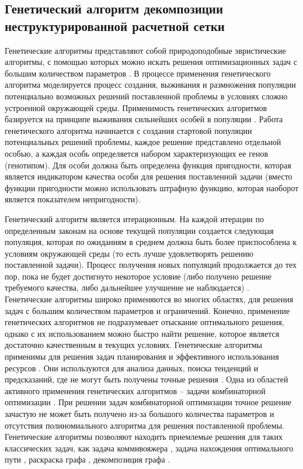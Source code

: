 \subsection{Генетический алгоритм декомпозиции неструктурированной расчетной сетки}\label{sec:text_2_genetic}

Генетические алгоритмы представляют собой природоподобные эвристические алгоритмы, с помощью которых можно искать решения оптимизационных задач с большим количеством параметров \cite{Chahar2021Gen,Wirayanti2025Gen}.
В процессе применения генетического алгоритма моделируется процесс создания, выживания и размножения популяции потенциально возможных решений поставленной проблемы в условиях сложно устроенной окружающей среды.
Применимость генетических алгоритмов базируется на принципе выживания сильнейших особей в популяции \cite{Naaman2025Gen}.
Работа генетического алгоритма начинается с создания стартовой популяции потенциальных решений проблемы, каждое решение представлено отдельной особью, а каждая особь определяется набором характеризующих ее генов (генотипом).
Для особи должна быть определена функция пригодности, которая является индикатором качества особи для решения поставленной задачи (вместо функции пригодности можно использовать штрафную функцию, которая наоборот является показателем непригодности). 

Генетический алгоритм является итерационным.
На каждой итерации по определенным законам на основе текущей популяции создается следующая популяция, которая по ожиданиям в среднем должна быть более приспособлена к условиям окружающей среды (то есть лучше удовлетворять решению поставленной задачи).
Процесс получения новых популяций продолжается до тех пор, пока не будет достигнуто некоторое условие (либо получено решение требуемого качества, либо дальнейшее улучшение не наблюдается) \cite{Charilogis2024Gen}.
Генетические алгоритмы широко применяются во многих областях, для решения задач с большим количеством параметров и ограничений.
Конечно, применение генетических алгоритмов не подразумевает отыскание оптимального решения, однако с их использованием можно быстро найти решение, которое является достаточно качественным в текущих условиях.
Генетические алгоритмы применимы для решения задач планирования \cite{Dawei2025Gen} и эффективного использования ресурсов \cite{Fang2025Gen,Mahmood2024Gen}.
Они используются для анализа данных, поиска тенденций и предсказаний, где не могут быть получены точные решения \cite{Kangra2024Gen,Sangeetha2025Gen}.
Одна из областей активного применения генетических алгоритмов – задачи комбинаторной оптимизации \cite{Hamdan2023Comb,Odeyemi2025Comb}.
При решении задач комбинаторной оптимизации точное решение зачастую не может быть получено из-за большого количества параметров и отсутствия полиномиального алгоритма для решения поставленной проблемы.
Генетические алгоритмы позволяют находить приемлемые решения для таких классических задач, как задача коммивояжера \cite{Kralev2024Gen}, задача нахождения оптимального пути \cite{Bogdanov2023Gen}, раскраска графа \cite{Malhotra2024Graph}, декомпозиция графа \cite{Chaouche2023Graph,Li2020Graph}.

